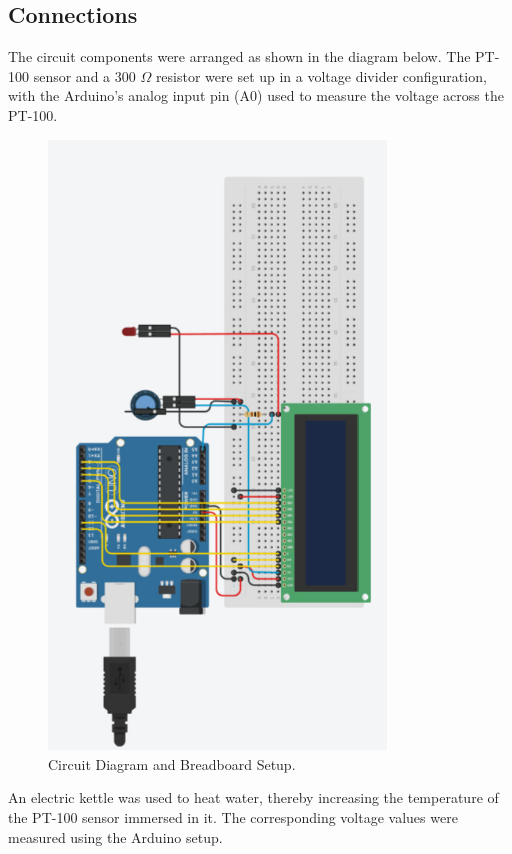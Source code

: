 \documentclass{article}
\begin{document}
	\subsection{Connections}
	The circuit components were arranged as shown in the diagram below. The PT-100 sensor and a 300 $\Omega$ resistor were set up in a voltage divider configuration, with the Arduino's analog input pin (A0) used to measure the voltage across the PT-100.
	
\begin{figure}[H]
	\centering
	\includegraphics[width=0.8\textwidth]{../figs/circuit}
	\caption{Circuit Diagram and Breadboard Setup.}
	\label{fig:circuit}
\end{figure}
	
	An electric kettle was used to heat water, thereby increasing the temperature of the PT-100 sensor immersed in it. The corresponding voltage values were measured using the Arduino setup.
	
\end{document}
